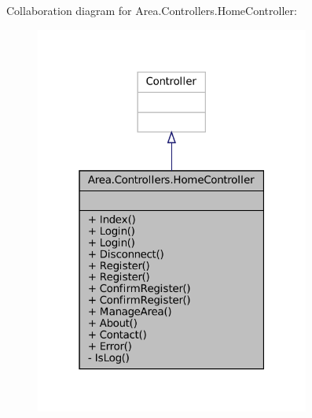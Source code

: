 Collaboration diagram for Area.\+Controllers.\+Home\+Controller\+:
\nopagebreak
\begin{figure}[H]
\begin{center}
\leavevmode
\includegraphics[width=256pt]{classArea_1_1Controllers_1_1HomeController__coll__graph}
\end{center}
\end{figure}
